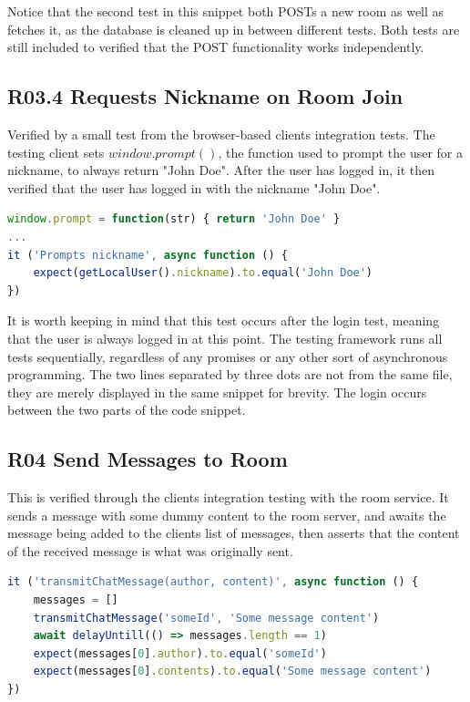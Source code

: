 Notice that the second test in this snippet both POSTs a new room as well as fetches it, as the database is cleaned up in between different tests. Both tests are still included to verified that the POST functionality works independently.


\subsection{R03.4 Requests Nickname on Room Join}
\label{vR03.4}

Verified by a small test from the browser-based clients integration tests. The testing client sets $window.prompt()$, the function used to prompt the user for a nickname, to always return "John Doe". After the user has logged in, it then verified that the user has logged in with the nickname "John Doe".

\begin{lstlisting}[language=JavaScript]
window.prompt = function(str) { return 'John Doe' } 
...
it ('Prompts nickname', async function () {
    expect(getLocalUser().nickname).to.equal('John Doe')
})
\end{lstlisting}

It is worth keeping in mind that this test occurs after the login test, meaning that the user is always logged in at this point. The testing framework runs all tests sequentially, regardless of any promises or any other sort of asynchronous programming. The two lines separated by three dots are not from the same file, they are merely displayed in the same snippet for brevity. The login occurs between the two parts of the code snippet.

\subsection{R04 Send Messages to Room}
\label{vR04}

This is verified through the clients integration testing with the room service. It sends a message with some dummy content to the room server, and awaits the message being added to the clients list of messages, then asserts that the content of the received message is what was originally sent.

\begin{lstlisting}[language=JavaScript]
it ('transmitChatMessage(author, content)', async function () {
    messages = []
    transmitChatMessage('someId', 'Some message content')
    await delayUntill(() => messages.length == 1)
    expect(messages[0].author).to.equal('someId')
    expect(messages[0].contents).to.equal('Some message content')
})

\end{lstlisting}

